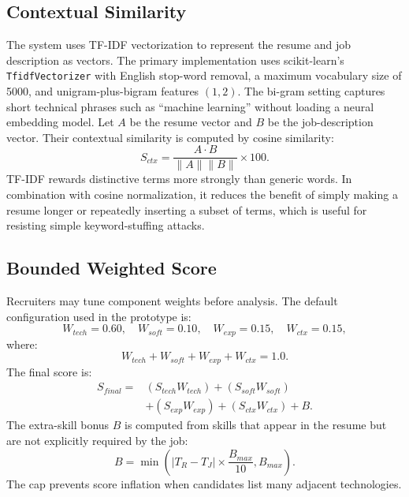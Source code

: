 \documentclass[conference]{IEEEtran}
\begin{document}
\subsection{Contextual Similarity}
The system uses TF-IDF vectorization to represent the resume and job description as vectors. The primary implementation uses scikit-learn's \texttt{TfidfVectorizer} with English stop-word removal, a maximum vocabulary size of 5000, and unigram-plus-bigram features \((1,2)\). The bi-gram setting captures short technical phrases such as ``machine learning'' without loading a neural embedding model. Let \(A\) be the resume vector and \(B\) be the job-description vector. Their contextual similarity is computed by cosine similarity:
\begin{equation}
S_{ctx}=\frac{A \cdot B}{\|A\|\|B\|}\times 100.
\end{equation}
TF-IDF rewards distinctive terms more strongly than generic words. In combination with cosine normalization, it reduces the benefit of simply making a resume longer or repeatedly inserting a subset of terms, which is useful for resisting simple keyword-stuffing attacks.

\subsection{Bounded Weighted Score}
Recruiters may tune component weights before analysis. The default configuration used in the prototype is:
\begin{equation}
W_{tech}=0.60,\quad W_{soft}=0.10,\quad W_{exp}=0.15,\quad W_{ctx}=0.15,
\end{equation}
where:
\begin{equation}
W_{tech}+W_{soft}+W_{exp}+W_{ctx}=1.0.
\end{equation}
The final score is:
\begin{equation}
\begin{split}
S_{final}={}&(S_{tech}W_{tech})+(S_{soft}W_{soft})\\
&+(S_{exp}W_{exp})+(S_{ctx}W_{ctx})+B.
\end{split}
\end{equation}
The extra-skill bonus \(B\) is computed from skills that appear in the resume but are not explicitly required by the job:
\begin{equation}
B=\min\left(|T_R-T_J|\times \frac{B_{max}}{10},B_{max}\right).
\end{equation}
The cap prevents score inflation when candidates list many adjacent technologies.
\end{document}
